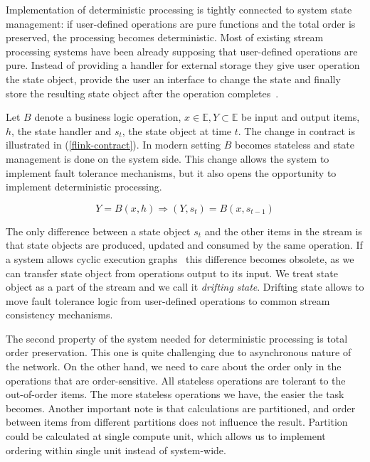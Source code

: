 
\label{motivation-section}

Implementation of deterministic processing is tightly connected to system state management: if user-defined operations are pure functions and the total order is preserved, the processing becomes deterministic. Most of existing stream processing systems have been already supposing that user-defined operations are pure. Instead of providing a handler for external storage they give user operation the state object, provide the user an interface to change the state and finally store the resulting state object after the operation completes~\cite{carbone2015apache, apache:storm, Noghabi:2017:SSS:3137765.3137770}.

Let $B$ denote a business logic operation, $x \in \mathbb{E}, Y \subset \mathbb{E}$ be input and output items, $h$, the state handler and $s_t$, the state object at time $t$. The change in contract is illustrated in (\ref{flink-contract}). In modern setting $B$ becomes stateless and state management is done on the system side. This change allows the system to implement fault tolerance mechanisms, but it also opens the opportunity to implement deterministic processing.

\begin{equation}
\label{flink-contract}
Y = B(x, h) \Rightarrow (Y, s_t) = B(x, s_{t-1}) 
\end{equation}

The only difference between a state object $s_t$ and the other items in the stream is that state objects are produced, updated and consumed by the same operation. If a system allows cyclic execution graphs~\cite{Murray:2013:NTD:2517349.2522738} this difference becomes obsolete, as we can transfer state object from operations output to its input. We treat state object as a part of the stream and we call it {\it drifting state}. Drifting state allows to move fault tolerance logic from user-defined operations to common stream consistency mechanisms.

The second property of the system needed for deterministic processing is total order preservation. This one is quite challenging due to asynchronous nature of the network. On the other hand, we need to care about the order only in the operations that are order-sensitive. All stateless operations are tolerant to the out-of-order items. The more stateless operations we have, the easier the task becomes. Another important note is that calculations are partitioned, and order between items from different partitions does not influence the result. Partition could be calculated at single compute unit, which allows us to implement ordering within single unit instead of system-wide.

